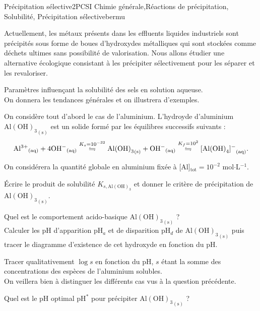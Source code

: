 
\begin{exercise}{Précipitation sélective}{2}{PCSI}
{Chimie générale,Réactions de précipitation, Solubilité, Précipitation sélective}{bermu}

Actuellement, les métaux présents dans les effluents liquides industriels sont précipités sous forme de boues d'hydroxydes métalliques qui sont stockées comme déchets ultimes sans possibilité de valorisation. Nous allons étudier une alternative écologique consistant à les précipiter sélectivement pour les séparer et les revaloriser.

\begin{questions}
\questioncours Paramètres influençant la solubilité des sels en solution aqueuse. \\
On donnera les tendances générales et on illustrera d'exemples.

\begin{EnvUplevel}
    On considère tout d'abord le cas de l'aluminium. L'hydroyde d'aluminium $\mathrm{{Al{(OH)}_3}_{(s)}}$ est un solide formé par les équilibres successifs suivants :
    $$\mathrm{{Al^{3+}}_{(aq)} + 4 {OH^-}_{(aq)} \overset{\mathnormal{K_s} = 10^{-32}}{\leftrightharpoons} {Al{(OH)}_3}_{(s)} + {OH^-}_{(aq)}  \overset{\mathnormal{K_f} = 10^2}{\leftrightharpoons} {[Al{(OH)}_4]^-}_{(aq)}}.$$
    
    On considérera la quantité globale en aluminium fixée à [Al]$_\text{tot} = 10^{-2}$ mol$\cdot$L$^{-1}$.
\end{EnvUplevel}

\question \'Ecrire le produit de solubilité $K_{s,\mathrm{{Al{(OH)}_3}}}$ et donner le critère de précipitation de $\mathrm{{Al{(OH)}_3}_{(s)}}$.

\question Quel est le comportement acido-basique $\mathrm{{Al{(OH)}_3}_{(s)}}$ ? \\ Calculer les pH d'apparition pH$_a$ et de disparition pH$_d$ de $\mathrm{{Al{(OH)}_3}_{(s)}}$ puis tracer le diagramme d'existence de cet hydroxyde en fonction du pH.

\question Tracer qualitativement $\log s$ en fonction du pH, $s$ étant la somme des concentrations des espèces de l'aluminium solubles. \\
On veillera bien à distinguer les différents cas vus à la question précédente.

\question Quel est le pH optimal pH$^\ast$ pour précipiter  $\mathrm{{Al{(OH)}_3}_{(s)}}$ ?


\end{questions}
\end{exercise}
